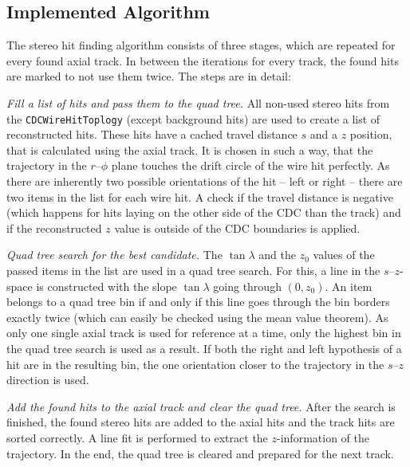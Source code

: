 \subsection{Implemented Algorithm}

The stereo hit finding algorithm consists of three stages, which are repeated for every found axial track. In between the iterations for every track, the found hits are marked to not use them twice. The steps are in detail:
\begin{zlist}
  \item \textit{Fill a list of hits and pass them to the quad tree.} All non-used stereo hits from the \texttt{CDCWireHitToplogy} (except background hits) are used to create a list of reconstructed hits. These hits have a cached travel distance $s$ and a $z$ position, that is calculated using the axial track. It is chosen in such a way, that the trajectory in the $r$--$\phi$ plane touches the drift circle of the wire hit perfectly. As there are inherently two possible orientations of the hit -- left or right -- there are two items in the list for each wire hit. A check if the travel distance is negative (which happens for hits laying on the other side of the CDC than the track) and if the reconstructed $z$ value is outside of the CDC boundaries is applied. 
  \item \textit{Quad tree search for the best candidate.} The $\tan \lambda$ and the $z_0$ values of the passed items in the list are used in a quad tree search. For this, a line in the $s$--$z$-space is constructed with the slope $\tan \lambda$ going through $(0, z_0)$. An item belongs to a quad tree bin if and only if this line goes through the bin borders exactly twice (which can easily be checked using the mean value theorem). As only one single axial track is used for reference at a time, only the highest bin in the quad tree search is used as a result. If both the right and left hypothesis of a hit are in the resulting bin, the one orientation closer to the trajectory in the $s$--$z$ direction is used.
  \item \textit{Add the found hits to the axial track and clear the quad tree.} After the search is finished, the found stereo hits are added to the axial hits and the track hits are sorted correctly. A line fit is performed to extract the $z$-information of the trajectory. In the end, the quad tree is cleared and prepared for the next track.
\end{zlist}


